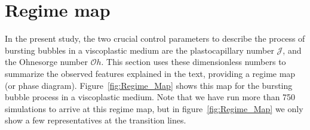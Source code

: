 \documentclass[final]{jfm}
\newcommand*\blue{\textcolor{blue}}
\begin{document}




\section{Regime map}\label{Sec::RegimeMaps}
In the present study, the two crucial control parameters to describe the process of bursting bubbles in a viscoplastic medium are the plastocapillary number $\mathcal{J}$, and the Ohnesorge number $\mathcal{O}h$. This section uses these dimensionless numbers to summarize the observed features explained in the text, providing a regime map (or phase diagram). Figure~\ref{fig:Regime_Map} shows this map for the bursting bubble process in a viscoplastic medium. Note that we have run more than 750 simulations to arrive at this regime map, but in figure~\ref{fig:Regime_Map} we only show a few representatives at the transition lines.
\end{document}
